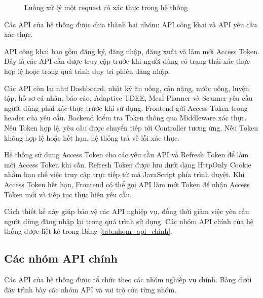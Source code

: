 \documentclass[12pt, a4paper]{report}
\begin{document}
\begin{figure}[htbp]
{%
}
\caption{Luồng xử lý một request có xác thực trong hệ thống}
\label{fig:request_auth_flow}
\end{figure}

Các API của hệ thống được chia thành hai nhóm: API công khai và API yêu cầu xác thực.

API công khai bao gồm đăng ký, đăng nhập, đăng xuất và làm mới Access Token. Đây là các API cần được truy cập trước khi người dùng có trạng thái xác thực hợp lệ hoặc trong quá trình duy trì phiên đăng nhập.

Các API còn lại như Dashboard, nhật ký ăn uống, cân nặng, nước uống, luyện tập, hồ sơ cá nhân, báo cáo, Adaptive TDEE, Meal Planner và Scanner yêu cầu người dùng phải xác thực trước khi sử dụng. Frontend gửi Access Token trong header của yêu cầu. Backend kiểm tra Token thông qua Middleware xác thực. Nếu Token hợp lệ, yêu cầu được chuyển tiếp tới Controller tương ứng. Nếu Token không hợp lệ hoặc hết hạn, hệ thống trả về lỗi xác thực.

Hệ thống sử dụng Access Token cho các yêu cầu API và Refresh Token để làm mới Access Token khi cần. Refresh Token được lưu dưới dạng HttpOnly Cookie nhằm hạn chế việc truy cập trực tiếp từ mã JavaScript phía trình duyệt. Khi Access Token hết hạn, Frontend có thể gọi API làm mới Token để nhận Access Token mới và tiếp tục thực hiện yêu cầu.

Cách thiết kế này giúp bảo vệ các API nghiệp vụ, đồng thời giảm việc yêu cầu người dùng đăng nhập lại trong quá trình sử dụng. Các nhóm API chính của hệ thống được liệt kê trong Bảng \ref{tab:nhom_api_chinh}.


\subsection{Các nhóm API chính}Các API của hệ thống được tổ chức theo các nhóm nghiệp vụ chính. Bảng dưới đây trình bày các nhóm API và vai trò của từng nhóm.
\end{document}

